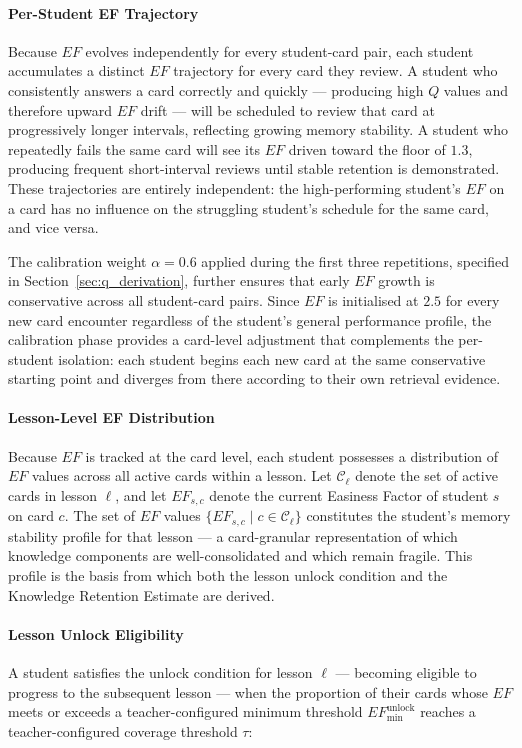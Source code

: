 \paragraph{Per-Student EF Trajectory}
Because $EF$ evolves independently for every student-card pair, each student accumulates a distinct $EF$ trajectory for every card they review. A student who consistently answers a card correctly and quickly — producing high $Q$ values and therefore upward $EF$ drift — will be scheduled to review that card at progressively longer intervals, reflecting growing memory stability. A student who repeatedly fails the same card will see its $EF$ driven toward the floor of $1.3$, producing frequent short-interval reviews until stable retention is demonstrated. These trajectories are entirely independent: the high-performing student's $EF$ on a card has no influence on the struggling student's schedule for the same card, and vice versa.

The calibration weight $\alpha = 0.6$ applied during the first three repetitions, specified in Section~\ref{sec:q_derivation}, further ensures that early $EF$ growth is conservative across all student-card pairs. Since $EF$ is initialised at $2.5$ for every new card encounter regardless of the student's general performance profile, the calibration phase provides a card-level adjustment that complements the per-student isolation: each student begins each new card at the same conservative starting point and diverges from there according to their own retrieval evidence.

\paragraph{Lesson-Level EF Distribution}
Because $EF$ is tracked at the card level, each student possesses a distribution of $EF$ values across all active cards within a lesson. Let $\mathcal{C}_{\ell}$ denote the set of active cards in lesson $\ell$, and let $EF_{s,c}$ denote the current Easiness Factor of student $s$ on card $c$. The set of $EF$ values $\{EF_{s,c} \mid c \in \mathcal{C}_{\ell}\}$ constitutes the student's memory stability profile for that lesson — a card-granular representation of which knowledge components are well-consolidated and which remain fragile. This profile is the basis from which both the lesson unlock condition and the Knowledge Retention Estimate are derived.

\paragraph{Lesson Unlock Eligibility}
A student satisfies the unlock condition for lesson $\ell$ — becoming eligible to progress to the subsequent lesson — when the proportion of their cards whose $EF$ meets or exceeds a teacher-configured minimum threshold $EF_{\min}^{\text{unlock}}$ reaches a teacher-configured coverage threshold $\tau$:

